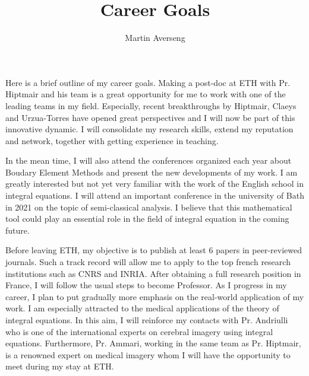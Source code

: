 \documentclass[]{article}
\title{Career Goals}
\author{Martin Averseng}
\begin{document}
\maketitle

Here is a brief outline of my career goals.
Making a post-doc at ETH with Pr. Hiptmair and his team is a great opportunity for me to work with one of the leading teams in my field. Especially, recent breakthroughs by Hiptmair, Claeys and Urzua-Torres have opened great perspectives and I will now be part of this innovative dynamic. I will consolidate my research skills, extend my reputation and network, together with getting experience in teaching. 

In the mean time, I will also attend the conferences organized each year about Boudary Element Methods and present the new developments of my work. I am greatly interested but not yet very familiar with the work of the English school in integral equations. I will attend an important conference in the university of Bath in 2021 on the topic of semi-classical analysis. I believe that this mathematical tool could play an essential role in the field of integral equation in the coming future. 


Before leaving ETH, my objective is to publish at least 6 papers in peer-reviewed journals. Such a track record will allow me to apply to the top french research institutions such as CNRS and INRIA. After obtaining a full research position in France, I will follow the usual steps to become Professor. 
As I progress in my career, I plan to put gradually more emphasis on the real-world application of my work. I am especially attracted to the medical applications of the theory of integral equations. In this aim, I will reinforce my contacts with Pr. Andriulli who is one of the international experts on cerebral imagery using integral equations. Furthermore, Pr. Ammari, working in the same team as Pr. Hiptmair, is a renowned expert on medical imagery whom I will have the opportunity to meet during my stay at ETH. 
\end{document}

